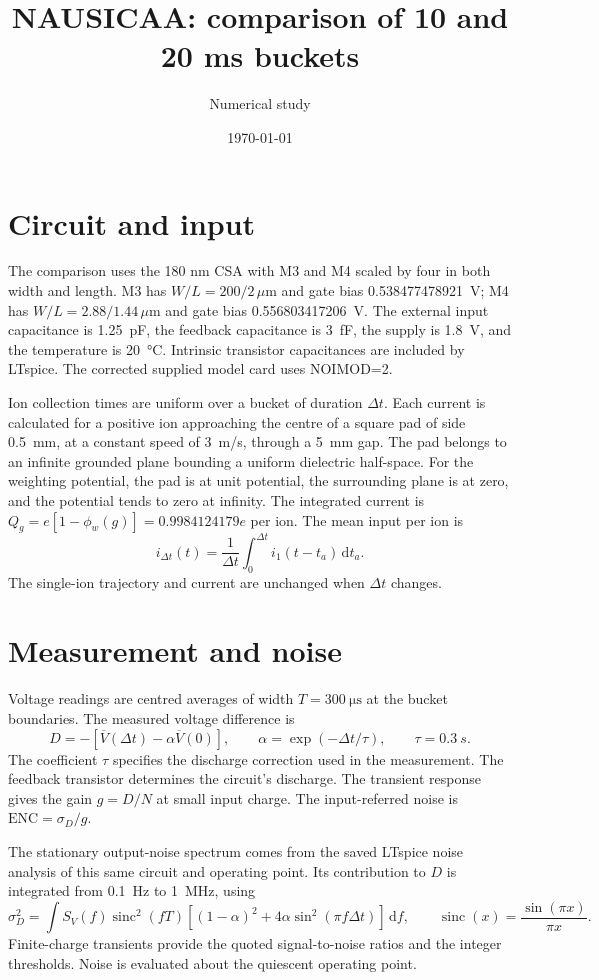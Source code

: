 \documentclass[11pt,a4paper]{article}
\title{NAUSICAA: comparison of 10 and 20 ms buckets}
\author{Numerical study}
\date{\today}
\begin{document}
\maketitle
\section{Circuit and input}
The comparison uses the 180 nm CSA with M3 and M4 scaled by four in both
width and length. M3 has $W/L=200/2\,\mu\mathrm{m}$ and gate bias
\SI{0.538477478921}{V}; M4 has $W/L=2.88/1.44\,\mu\mathrm{m}$ and gate bias
\SI{0.556803417206}{V}. The external input capacitance is \SI{1.25}{pF},
the feedback capacitance is \SI{3}{fF}, the supply is \SI{1.8}{V}, and the
temperature is \SI{20}{\celsius}. Intrinsic transistor capacitances are
included by LTspice. The corrected supplied model card uses NOIMOD=2.

Ion collection times are uniform over a bucket of duration $\Delta t$.
Each current is calculated for a positive ion approaching the centre of a
square pad of side \SI{0.5}{mm}, at a constant speed of \SI{3}{m/s}, through
a \SI{5}{mm} gap. The pad belongs to an infinite grounded plane bounding a
uniform dielectric half-space. For the weighting potential, the pad is at
unit potential, the surrounding plane is at zero, and the potential tends
to zero at infinity. The integrated current is
$Q_g=e[1-\phi_w(g)]=0.9984124179e$ per ion.
The mean input per ion is
\[
 i_{\Delta t}(t)=\frac{1}{\Delta t}\int_0^{\Delta t}i_1(t-t_a)\,\mathrm{d}t_a.
\]
The single-ion trajectory and current are unchanged when $\Delta t$ changes.

\section{Measurement and noise}
Voltage readings are centred averages of width $T=\SI{300}{\micro\second}$
at the bucket boundaries. The measured voltage difference is
\[
 D=-[\overline V(\Delta t)-\alpha\overline V(0)],\qquad
 \alpha=\exp(-\Delta t/\tau),\qquad\tau=\SI{0.3}{s}.
\]
The coefficient $\tau$ specifies the discharge correction used in the
measurement. The feedback transistor determines the circuit's discharge.
The transient response gives the gain $g=D/N$ at small input charge.
The input-referred noise is $\mathrm{ENC}=\sigma_D/g$.

The stationary output-noise spectrum comes from the saved LTspice noise
analysis of this same circuit and operating point. Its contribution to $D$
is integrated from \SI{0.1}{Hz} to \SI{1}{MHz}, using
\[
 \sigma_D^2=\int S_V(f)\operatorname{sinc}^2(fT)
 \left[(1-\alpha)^2+4\alpha\sin^2(\pi f\Delta t)\right]\,\mathrm{d}f,
 \qquad\operatorname{sinc}(x)=\frac{\sin(\pi x)}{\pi x}.
\]
Finite-charge transients provide the quoted signal-to-noise ratios and the
integer thresholds. Noise is evaluated about the quiescent operating point.
\end{document}
